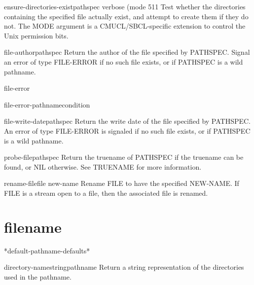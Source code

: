 \begin{function}{ensure-directories-exist}{pathspec \key verbose (mode 511}{}
  Test whether the directories containing the specified file
  actually exist, and attempt to create them if they do not.
  The MODE argument is a CMUCL/SBCL-specific extension to control
  the Unix permission bits.
\end{function}

\begin{function}{file-author}{pathspec}{}
  Return the author of the file specified by PATHSPEC. Signal an
error of type FILE-ERROR if no such file exists, or if PATHSPEC
is a wild pathname.
\end{function}

\begin{condition-type}{file-error}{}{}
  
\end{condition-type}

\begin{function}{file-error-pathname}{condition}{}
  
\end{function}

\begin{function}{file-write-date}{pathspec}{}
  Return the write date of the file specified by PATHSPEC.
An error of type FILE-ERROR is signaled if no such file exists,
or if PATHSPEC is a wild pathname.
\end{function}

\begin{function}{probe-file}{pathspec}{}
  Return the truename of PATHSPEC if the truename can be found,
or NIL otherwise.  See TRUENAME for more information.
\end{function}

\begin{function}{rename-file}{file new-name}{}
  Rename FILE to have the specified NEW-NAME. If FILE is a stream open to a
  file, then the associated file is renamed.
\end{function}

\section{filename}

\begin{variable}{*default-pathname-defaults*}{}{}
  
\end{variable}

\begin{function}{directory-namestring}{pathname}{}
  Return a string representation of the directories used in the pathname.
\end{function}

